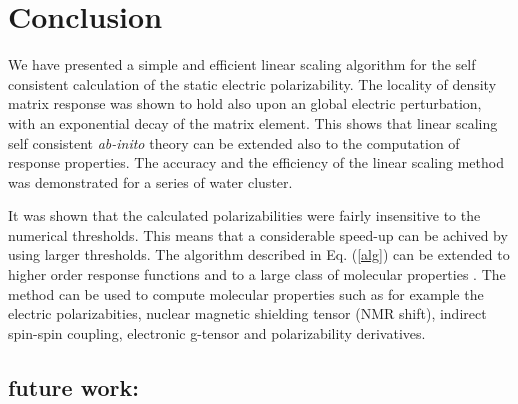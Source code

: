 \documentclass[twocolumn,showpacs,preprintnumbers,amsmath,amssymb]{revtex4}
\begin{document}
\section{Conclusion}






 We have presented a simple and efficient linear
 scaling algorithm for the self consistent
 calculation of the static electric polarizability.
 The locality of
 density matrix response was shown to hold also
 upon an global electric perturbation, with an
 exponential decay of the matrix element. This 
 shows that linear scaling self consistent 
 \emph{ab-inito} theory can be extended also to
 the computation of response properties. The
 accuracy and the efficiency of the linear scaling
 method was demonstrated for a series of water
 cluster.

 It was shown that the calculated polarizabilities
 were fairly insensitive to the numerical thresholds.
 This means that a considerable speed-up can be
 achived by using larger thresholds. The algorithm 
 described in Eq. (\ref{alg}) can be extended to 
 higher order response functions and to a 
 large class of molecular properties \cite{Me}.
 The method can be used to compute molecular
 properties such as for example the electric
 polarizabities, nuclear magnetic shielding 
 tensor (NMR shift), indirect spin-spin 
 coupling, electronic g-tensor and polarizability
 derivatives.


\subsection{future work: }



\end{document}
